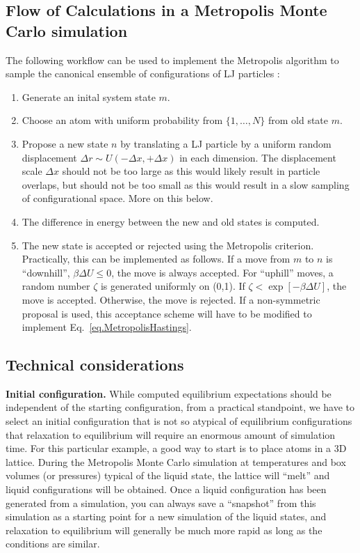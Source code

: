 \documentclass[aip,jcp,preprint,superscriptaddress,floatfix]{revtex4-1}
\begin{document}
\subsection{Flow of Calculations in a Metropolis Monte Carlo simulation}

The following workflow can be used to implement the Metropolis algorithm to sample the canonical ensemble of configurations of LJ particles \cite{Shell.Notes, Maginn.Notes}:

\begin{enumerate}
\setlength{\itemsep}{0em} %
\item Generate an inital system state $m$.
\item Choose an atom with uniform probability from $\{1, \ldots, N\}$ from old state $m$.
\item Propose a new state $n$ by translating a LJ particle by a uniform random displacement $\Delta r \sim U(-\Delta x, +\Delta x)$ in each dimension.
	The displacement scale $\Delta x$ should not be too large as this would
	likely result in particle overlaps, but should not be too small
	as this would result in a slow sampling of configurational space.
	More on this below.
\item The difference in energy between the new and old states is computed.
\item The new state is accepted or rejected using the Metropolis criterion.
	Practically, this can be implemented as follows. 
	If a move from $m$ to $n$ is ``downhill'', $\beta \Delta U \leq 0$,
	the move is always accepted. For ``uphill'' moves, a random
	number $\zeta$ is generated uniformly on (0,1).  
	If $\zeta < \exp[-\beta {\Delta U}]$, the move is
	accepted.  Otherwise, the move is rejected. 
	If a non-symmetric proposal is used, this acceptance scheme will have to be modified to implement Eq.~\ref{eq.MetropolisHastings}.
\end{enumerate}

\subsection{Technical considerations}

\textbf{Initial configuration.} 
While computed equilibrium expectations should be independent of the starting configuration, from a practical standpoint, we have to select an initial configuration that is not so atypical of equilibrium configurations that relaxation to equilibrium will require an enormous amount of simulation time. 
For this particular example, a good way to start is to place atoms in a 3D lattice. 
During the Metropolis Monte Carlo simulation at temperatures and box volumes (or pressures) typical of the liquid state, the lattice will ``melt'' and liquid configurations will be obtained. 
Once a liquid configuration has been generated from a simulation, you can always save a ``snapshot'' from this simulation as a starting point for a new simulation of the liquid states, and relaxation to equilibrium will generally be much more rapid as long as the conditions are similar.
\end{document}
